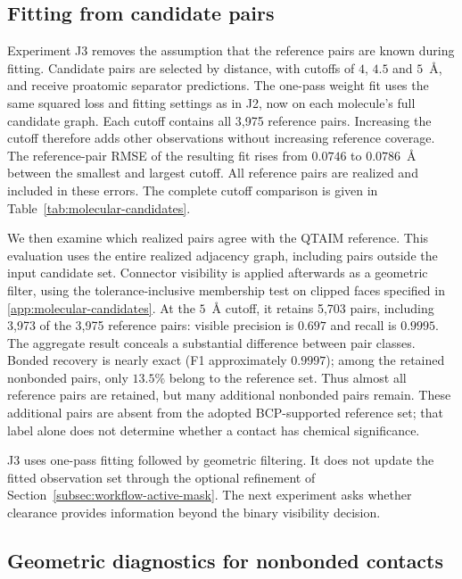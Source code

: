 \subsection{Fitting from candidate pairs}
\label{subsec:molecular-candidates}

Experiment J3 removes the assumption that the reference pairs are known during fitting. Candidate pairs are selected by distance, with cutoffs of $4$, $4.5$ and $5$~\AA{}, and receive proatomic separator predictions. The one-pass weight fit uses the same squared loss and fitting settings as in J2, now on each molecule's full candidate graph. Each cutoff contains all 3,975 reference pairs. Increasing the cutoff therefore adds other observations without increasing reference coverage. The reference-pair RMSE of the resulting fit rises from $0.0746$ to $0.0786$~\AA{} between the smallest and largest cutoff. All reference pairs are realized and included in these errors. The complete cutoff comparison is given in Table~\ref{tab:molecular-candidates}.

We then examine which realized pairs agree with the QTAIM reference. This evaluation uses the entire realized adjacency graph, including pairs outside the input candidate set. Connector visibility is applied afterwards as a geometric filter, using the tolerance-inclusive membership test on clipped faces specified in \ref{app:molecular-candidates}. At the $5$~\AA{} cutoff, it retains 5,703 pairs, including 3,973 of the 3,975 reference pairs: visible precision is $0.697$ and recall is $0.9995$. The aggregate result conceals a substantial difference between pair classes. Bonded recovery is nearly exact (F1 approximately $0.9997$); among the retained nonbonded pairs, only $13.5\%$ belong to the reference set. Thus almost all reference pairs are retained, but many additional nonbonded pairs remain. These additional pairs are absent from the adopted BCP-supported reference set; that label alone does not determine whether a contact has chemical significance.

J3 uses one-pass fitting followed by geometric filtering. It does not update the fitted observation set through the optional refinement of Section~\ref{subsec:workflow-active-mask}. The next experiment asks whether clearance provides information beyond the binary visibility decision.

\subsection{Geometric diagnostics for nonbonded contacts}
\label{subsec:molecular-diagnostics}

